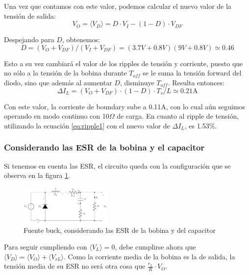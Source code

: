 \documentclass[e4_tp1_main.tex]{subfiles}
\begin{document}
Una vez que contamos con este valor, podemos calcular el nuevo valor de la tensi\'on de salida: 
\begin{equation}
	V_O = \langle V_D \rangle = D \cdot V_I - (1-D) \cdot V_{DF}   
\end{equation}

Despejando para $D$, obtenemos:
\begin{equation}
	D = (V_O + V_{DF})/(V_I + V_{DF}) 
	= (3.7V + 0.8V)(9V + 0.8V)
	\simeq 0.46 
\end{equation}

Esto a su vez cambiar\'a el valor de los ripples de tensi\'on y corriente, puesto que no s\'olo a la tensi\'on de la bobina durante $T_{off}$ se le suma la tensi\'on forward del diodo, sino que adem\'as al aumentar $D$, disminuye $T_{off}$. Resulta entonces: 
\begin{equation}
	\Delta I_L = (V_O + V_{DF}) \cdot (1-D) \cdot T_s / L
	\simeq 0.21\text{A}
\end{equation} 

Con este valor, la corriente de boundary sube a 0.11A, con lo cual a\'un seguimos operando en modo continuo con 10$\Omega$ de carga. En cuanto al ripple de tensi\'on, utilizando la ecuaci\'on \ref{eq:ripple1} con el nuevo valor de $\Delta I_L$, es 1.53\%.


\subsubsection{Considerando las ESR de la bobina y el capacitor}

Si tenemos en cuenta las ESR, el circuito queda con la configuraci\'on que se observa en la figura \ref{fig:buck-esrs}.

\begin{figure}
	\centering
	\includegraphics[width=0.4\textwidth]{images/ej2/buck_esrs.pdf}
	\caption{Fuente buck, considerando las ESR de la bobina y del capacitor}
	\label{fig:buck-esrs}
\end{figure}


Para seguir cumpliendo con $\langle V_L \rangle = 0$, debe cumplirse ahora que $\langle V_D \rangle = \langle V_O \rangle + \langle V_{rL} \rangle$. Como la corriente media de la bobina es la de salida, la tensi\'on media de su ESR no ser\'a otra cosa que $\frac{r_L}{R} \cdot V_O$. 
\end{document}
